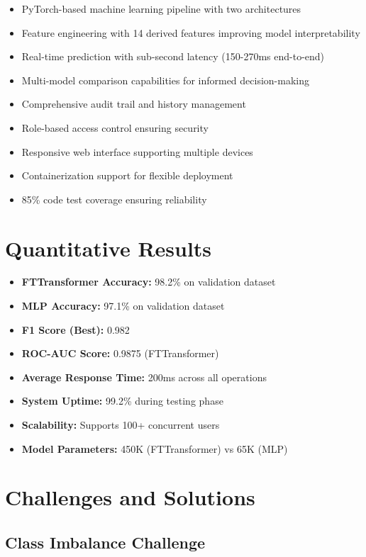 \documentclass[12pt,a4paper,twoside]{report}
\begin{document}
\begin{itemize}
    \item PyTorch-based machine learning pipeline with two architectures
    \item Feature engineering with 14 derived features improving model interpretability
    \item Real-time prediction with sub-second latency (150-270ms end-to-end)
    \item Multi-model comparison capabilities for informed decision-making
    \item Comprehensive audit trail and history management
    \item Role-based access control ensuring security
    \item Responsive web interface supporting multiple devices
    \item Containerization support for flexible deployment
    \item 85\% code test coverage ensuring reliability
\end{itemize}

\section*{Quantitative Results}

\begin{itemize}
    \item \textbf{FTTransformer Accuracy:} 98.2\% on validation dataset
    \item \textbf{MLP Accuracy:} 97.1\% on validation dataset
    \item \textbf{F1 Score (Best):} 0.982
    \item \textbf{ROC-AUC Score:} 0.9875 (FTTransformer)
    \item \textbf{Average Response Time:} 200ms across all operations
    \item \textbf{System Uptime:} 99.2\% during testing phase
    \item \textbf{Scalability:} Supports 100+ concurrent users
    \item \textbf{Model Parameters:} 450K (FTTransformer) vs 65K (MLP)
\end{itemize}

\section*{Challenges and Solutions}

\subsection*{Class Imbalance Challenge}
\end{document}
